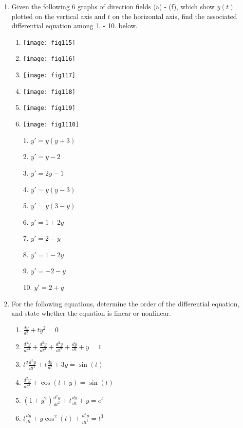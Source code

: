 \documentclass[a4paper,12pt,leqno]{article}
\begin{document}

\begin{enumerate}                    %


\item Given the following 6 graphs of direction fields (a) - (f), which show $y(t)$ plotted on the vertical axis and $t$ on the horizontal axis, find the associated differential equation among 1. - 10. below.
\begin{enumerate}
\item \texttt{[image: fig115]}
\item \texttt{[image: fig116]}
\item \texttt{[image: fig117]}
\item \texttt{[image: fig118]}
\item \texttt{[image: fig119]}
\item \texttt{[image: fig1110]}
\end{enumerate}
\begin{enumerate}
\item[1.] $y'=y(y+3)$
\item[2.] $y'=y-2$
\item[3.] $y' = 2y -1$
\item[4.] $y'=y(y-3)$
\item[5.] $y'=y(3-y)$
\item[6.] $y' = 1+2y$
\item[7.] $y'=2-y$
\item[8.] $y'=1-2y$
\item[9.] $y' =-2-y$
\item[10.] $y' = 2+y$
\end{enumerate}


\item For the following equations, determine the order of the differential equation, and state whether the equation is linear or nonlinear.
\begin{enumerate}
\item $ \frac{dy}{dt} + ty^2 = 0$
\item $\frac{d^4y}{dt^4} + \frac{d^3 y}{dt^3} + \frac{d^2 y}{dt^2} + \frac{dy}{dt} + y = 1$
\item $t^2 \frac{d^2 y}{dt^2} + t \frac{dy}{dt} +3y = \sin(t)$
\item $\frac{d^2 y}{dt^2} + \cos(t+y) = \sin(t) $
\item $(1+y^2)\frac{d^2 y}{dt^2} + t \frac{dy}{dt} + y = e^t$
\item $t \frac{dy}{dt} + y \cos^2(t) + \frac{d^3 y}{dt^3} = t^3$
\end{enumerate}


\end{enumerate}
\end{document}

